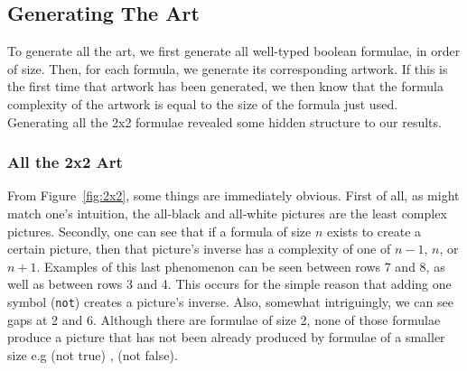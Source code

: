 \subsection{Generating The Art}

To generate all the art, we first generate all well-typed boolean formulae, in
order of size.  Then, for each formula, we generate its corresponding artwork.
If this is the first time that artwork has been generated, we then know that
the formula complexity of the artwork is equal to the size of the formula just
used.  Generating all the 2x2 formulae revealed some hidden structure to our
results.

\subsubsection{All the 2x2 Art}

From Figure~\ref{fig:2x2}, some things are immediately obvious.  First of all,
as might match one's intuition, the all-black and all-white pictures are the
least complex pictures.  Secondly, one can see that if a formula of size $n$
exists to create a certain picture, then that picture's inverse has a
complexity of one of $n-1$, $n$, or $n+1$.  Examples of this last phenomenon
can be seen between rows 7 and 8, as well as between rows 3 and 4.  This occurs
for the simple reason that adding one symbol ({\tt not}) creates a picture's
inverse.  Also, somewhat intriguingly, we can see gaps at 2 and 6.  Although
there are formulae of size 2, none of those formulae produce a picture that has
not been already produced by formulae of a smaller size e.g (not true) , (not false).

